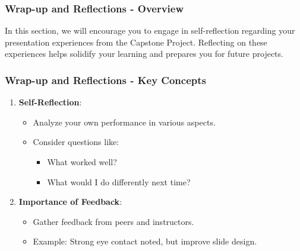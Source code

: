 \documentclass{beamer}
\begin{document}
\begin{frame}[fragile]
    \frametitle{Wrap-up and Reflections - Overview}
    In this section, we will encourage you to engage in self-reflection regarding your presentation experiences from the Capstone Project. Reflecting on these experiences helps solidify your learning and prepares you for future projects.
\end{frame}

\begin{frame}[fragile]
    \frametitle{Wrap-up and Reflections - Key Concepts}
    \begin{enumerate}
        \item \textbf{Self-Reflection}:
            \begin{itemize}
                \item Analyze your own performance in various aspects.
                \item Consider questions like: 
                    \begin{itemize}
                        \item What worked well?
                        \item What would I do differently next time?
                    \end{itemize}
            \end{itemize}
        \item \textbf{Importance of Feedback}:
            \begin{itemize}
                \item Gather feedback from peers and instructors.
                \item Example: Strong eye contact noted, but improve slide design.
            \end{itemize}
    \end{enumerate}
\end{frame}
\end{document}
